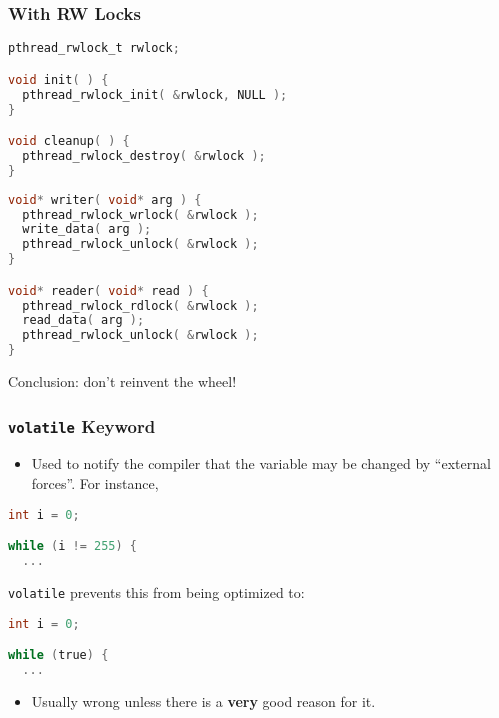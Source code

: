 \begin{frame}[fragile]
\frametitle{With RW Locks}

\begin{multicols}{2}
\begin{lstlisting}[language=C]
pthread_rwlock_t rwlock;

void init( ) {
  pthread_rwlock_init( &rwlock, NULL );
}

void cleanup( ) {
  pthread_rwlock_destroy( &rwlock );
}
\end{lstlisting}

\columnbreak

\begin{lstlisting}[language=C]
void* writer( void* arg ) {
  pthread_rwlock_wrlock( &rwlock );
  write_data( arg );
  pthread_rwlock_unlock( &rwlock );
}

void* reader( void* read ) {
  pthread_rwlock_rdlock( &rwlock );
  read_data( arg );
  pthread_rwlock_unlock( &rwlock );
}
\end{lstlisting}

\end{multicols}

Conclusion: don't reinvent the wheel!

\end{frame}



\begin{frame}[fragile]
  \frametitle{{\tt volatile} Keyword}


  \begin{itemize}
    \item Used to notify the compiler that the variable may be changed by ``external forces''. For instance,
  \end{itemize}

  \begin{lstlisting}[language=C]
int i = 0;

while (i != 255) {
  ...
  \end{lstlisting}

{\tt volatile} prevents this from being optimized to:

  \begin{lstlisting}[language=C]
int i = 0;

while (true) {
  ...
  \end{lstlisting}

  \begin{itemize}
    \item Usually wrong unless there is a {\bf very} good reason for it.
  \end{itemize}


\end{frame}




